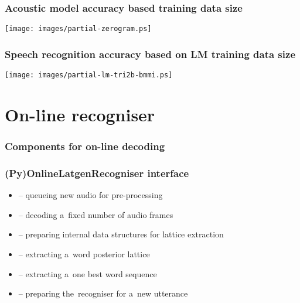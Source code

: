 \begin{frame}\frametitle{Acoustic model accuracy based training data size} 
    \begin{center}
        \texttt{[image: images/partial-zerogram.ps]}
    \end{center}
\end{frame}

\begin{frame}\frametitle{Speech recognition accuracy based on LM training data size} 
    \begin{center}
        \texttt{[image: images/partial-lm-tri2b-bmmi.ps]}
    \end{center}
\end{frame}


\section{On-line recogniser} %

\begin{frame}\frametitle{Components for on-line decoding} 
    \begin{center}
        
    \end{center}
\end{frame}

\begin{frame}\frametitle{(Py)OnlineLatgenRecogniser interface} 
    \begin{itemize}
        \item {} -- queueing new audio for pre-processing
        \item {} -- decoding a~fixed number of audio frames
        \item {} -- preparing internal data structures for lattice extraction
        \item {} -- extracting a~word posterior lattice
        \item {} -- extracting a~one best word sequence
        \item {} -- preparing the~recogniser for a~new utterance
    \end{itemize}
\end{frame}

